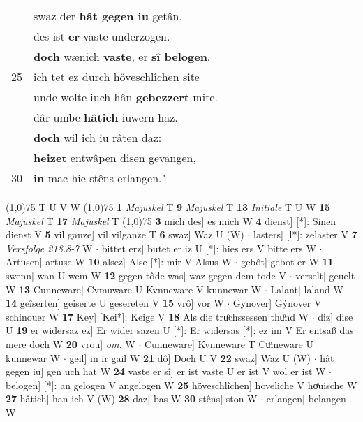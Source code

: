 \documentclass[8pt,a4paper,notitlepage]{article}
\begin{document}
\begin{table}[ht]
\begin{minipage}[t]{0.5\linewidth}
\begin{tabular}{rl}
 & swaz der \textbf{hât gegen iu} getân,\\ 
 & des ist \textbf{er} vaste underzogen.\\ 
 & \textbf{doch} wænich \textbf{vaste}, er \textbf{sî belogen}.\\ 
25 & ich tet ez durch höveschlîchen site\\ 
 & unde wolte iuch hân \textbf{gebezzert} mite.\\ 
 & dâr umbe \textbf{hâtich} iuwern haz.\\ 
 & \textbf{doch} wil ich iu râten daz:\\ 
 & \textbf{heizet} entwâpen disen gevangen,\\ 
30 & \textbf{in} mac hie stêns erlangen."\\ 
\end{tabular}
\scriptsize
\line(1,0){75} \newline
T U V W \newline
\line(1,0){75} \newline
\textbf{1} \textit{Majuskel} T  \textbf{9} \textit{Majuskel} T  \textbf{13} \textit{Initiale} T U W  \textbf{15} \textit{Majuskel} T  \textbf{17} \textit{Majuskel} T  \newline
\line(1,0){75} \newline
\textbf{3} mich des] es mich W \textbf{4} dienst] [*]: Sinen dienst V \textbf{5} vil ganze] vil vilganze T \textbf{6} swaz] Waz U (W)  $\cdot$ lasters] [l*]: zelaster V \textbf{7} \textit{Versfolge 218.8-7} W   $\cdot$ bittet erz] butet er iz U [*]: hies ers V bitte ers W  $\cdot$ Artusen] artuse W \textbf{10} alsez] Alse [*]: mir V Alsus W  $\cdot$ gebôt] gebot er W \textbf{11} swenn] wan U wem W \textbf{12} gegen tôde was] waz gegen dem tode V  $\cdot$ verselt] geuelt W \textbf{13} Cunneware] Cvmuware U Kvnneware V kunnewar W  $\cdot$ Lalant] laland W \textbf{14} geîserten] geiserte U gesereten V \textbf{15} vrô] vor W  $\cdot$ Gynover] Gẏnover V schinouer W \textbf{17} Key] [Kei*]: Keige V \textbf{18} Als die truͦchssessen thuͦnd W  $\cdot$ diz] dise U \textbf{19} er widersaz ez] Er wider sazen U [*]: Er widersas [*]: ez im V Er entsaß das mere doch W \textbf{20} vrou] \textit{om.} W  $\cdot$ Cunneware] Kvnneware T Cuͦmeware U kunnewar W  $\cdot$ geil] in ir gail W \textbf{21} dô] Doch U V \textbf{22} swaz] Waz U (W)  $\cdot$ hât gegen iu] gen uch hat W \textbf{24} vaste er sî] er ist vaste U er ist V wol er ist W  $\cdot$ belogen] [*]: an gelogen V angelogen W \textbf{25} höveschlîchen] hoveliche V hoͤuische W \textbf{27} hâtich] han ich V (W) \textbf{28} daz] bas W \textbf{30} stêns] ston W  $\cdot$ erlangen] belangen W \newline
\end{minipage}
\end{table}
\end{document}
